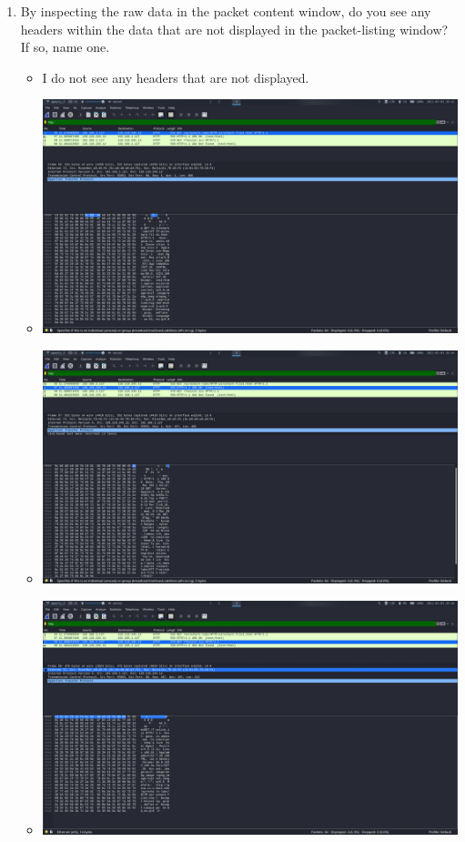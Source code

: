 \documentclass[11pt]{article}
\begin{document}
\begin{enumerate}
\begin{itemize}
  \end{itemize}
\item By inspecting the raw data in the packet content window, do you see any
  headers within the data that are not displayed in the packet-listing window?  If
  so, name one.
  \begin{itemize}
  \item I do not see any headers that are not displayed.
  \item \includegraphics[width=\textwidth]{img/ws-raw-data-1}
  \item \includegraphics[width=\textwidth]{img/ws-raw-data-2}
  \item \includegraphics[width=\textwidth]{img/ws-raw-data-3}

\end{itemize}
\end{enumerate}
\end{document}
